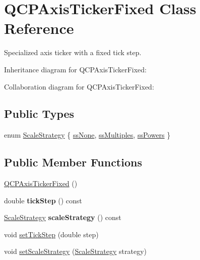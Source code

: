 \hypertarget{classQCPAxisTickerFixed}{}\section{Q\+C\+P\+Axis\+Ticker\+Fixed Class Reference}
\label{classQCPAxisTickerFixed}


Specialized axis ticker with a fixed tick step.  




Inheritance diagram for Q\+C\+P\+Axis\+Ticker\+Fixed\+:


Collaboration diagram for Q\+C\+P\+Axis\+Ticker\+Fixed\+:
\subsection*{Public Types}
\begin{DoxyCompactItemize}
\item 
enum \hyperlink{classQCPAxisTickerFixed_a15b3d38b935d404b1311eb85cfb6a439}{Scale\+Strategy} \{ \hyperlink{classQCPAxisTickerFixed_a15b3d38b935d404b1311eb85cfb6a439a6621275677a05caa0de204ae3956b85f}{ss\+None}, 
\hyperlink{classQCPAxisTickerFixed_a15b3d38b935d404b1311eb85cfb6a439a22f651785f6412645837421896561104}{ss\+Multiples}, 
\hyperlink{classQCPAxisTickerFixed_a15b3d38b935d404b1311eb85cfb6a439ac39d5813e9165ebd494307ae61ce5dce}{ss\+Powers}
 \}
\end{DoxyCompactItemize}
\subsection*{Public Member Functions}
\begin{DoxyCompactItemize}
\item 
\hyperlink{classQCPAxisTickerFixed_a96d2b053a15f9b8e94550c3efeff6a34}{Q\+C\+P\+Axis\+Ticker\+Fixed} ()
\item 
double {\bfseries tick\+Step} () const \hypertarget{classQCPAxisTickerFixed_a69e2dbe18a3fbc4108c7ea109fa5d3da}{}\label{classQCPAxisTickerFixed_a69e2dbe18a3fbc4108c7ea109fa5d3da}

\item 
\hyperlink{classQCPAxisTickerFixed_a15b3d38b935d404b1311eb85cfb6a439}{Scale\+Strategy} {\bfseries scale\+Strategy} () const \hypertarget{classQCPAxisTickerFixed_ab9cc237725db85b932dc6f3dd08b93fa}{}\label{classQCPAxisTickerFixed_ab9cc237725db85b932dc6f3dd08b93fa}

\item 
void \hyperlink{classQCPAxisTickerFixed_a4bc83d85a4f81d4abdd3fa5042d7b833}{set\+Tick\+Step} (double step)
\item 
void \hyperlink{classQCPAxisTickerFixed_acbc7c9bcd80b3dc3edee5f0519d301f6}{set\+Scale\+Strategy} (\hyperlink{classQCPAxisTickerFixed_a15b3d38b935d404b1311eb85cfb6a439}{Scale\+Strategy} strategy)
\end{DoxyCompactItemize}
